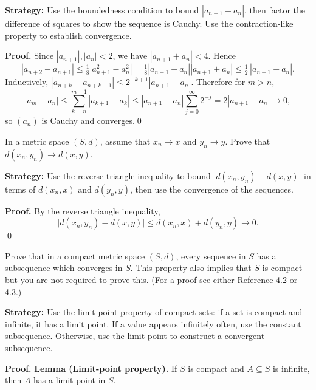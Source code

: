 \noindent\textbf{Strategy:} Use the boundedness condition to bound $|a_{n+1} + a_n|$, then factor the difference of squares to show the sequence is Cauchy. Use the contraction-like property to establish convergence.

\noindent\textbf{Proof.}
Since $|a_{n+1}|,|a_n|<2$, we have $|a_{n+1}+a_n|<4$. Hence
\[
|a_{n+2}-a_{n+1}|\le\tfrac18|a_{n+1}^2-a_n^2|=\tfrac18|a_{n+1}-a_n||a_{n+1}+a_n|
\le \tfrac12\,|a_{n+1}-a_n|.
\]
Inductively, $|a_{n+k}-a_{n+k-1}|\le 2^{-k+1}|a_{n+1}-a_n|$. Therefore for $m>n$,
\[
|a_m-a_n|\le \sum_{k=n}^{m-1}|a_{k+1}-a_k|\le |a_{n+1}-a_n|\sum_{j=0}^{\infty}2^{-j}=2|a_{n+1}-a_n|\to 0,
\]
so $(a_n)$ is Cauchy and converges.\qed
\medskip



\begin{problembox}
\begin{problemstatement}
In a metric space $(S, d)$, assume that $x_n \to x$ and $y_n \to y$. Prove that $d(x_n, y_n) \to d(x, y)$.
\end{problemstatement}
\end{problembox}

\noindent\textbf{Strategy:} Use the reverse triangle inequality to bound $|d(x_n, y_n) - d(x, y)|$ in terms of $d(x_n, x)$ and $d(y_n, y)$, then use the convergence of the sequences.

\noindent\textbf{Proof.}
By the reverse triangle inequality,
\[
\big|d(x_n,y_n)-d(x,y)\big|\le d(x_n,x)+d(y_n,y)\to 0.
\]\qed
\medskip



\begin{problembox}
\begin{problemstatement}
Prove that in a compact metric space $(S, d)$, every sequence in $S$ has a subsequence which converges in $S$. This property also implies that $S$ is compact but you are not required to prove this. (For a proof see either Reference 4.2 or 4.3.)
\end{problemstatement}
\end{problembox}

\noindent\textbf{Strategy:} Use the limit-point property of compact sets: if a set is compact and infinite, it has a limit point. If a value appears infinitely often, use the constant subsequence. Otherwise, use the limit point to construct a convergent subsequence.

\noindent\textbf{Proof.}
\textbf{Lemma (Limit-point property).}
If \(S\) is compact and \(A\subseteq S\) is infinite, then \(A\) has a limit point in \(S\).

